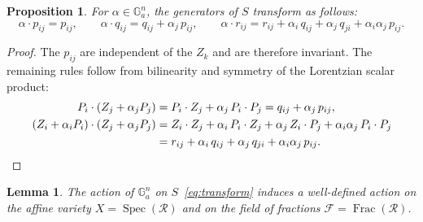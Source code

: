 \documentclass[12pt,a4paper]{extarticle}
\newtheorem{lemma}[theorem]{Lemma}
\newtheorem{proposition}[theorem]{Proposition}
\theoremstyle{definition}
\begin{document}
\begin{proposition}\label{prop:transformation-rules}
For $\alpha \in \mathbb{G}_a^n$, the generators of $S$ transform as follows:
\begin{equation}\label{eq:transform}
\alpha \cdot p_{ij} = p_{ij}, \qquad
\alpha \cdot q_{ij} = q_{ij} + \alpha_j\, p_{ij}, \qquad
\alpha \cdot r_{ij} = r_{ij} + \alpha_i\, q_{ij} + \alpha_j\, q_{ji} + \alpha_i \alpha_j\, p_{ij}.
\end{equation}
\end{proposition}

\begin{proof}
The $p_{ij}$ are independent of the $Z_k$ and are therefore invariant. The remaining rules follow from bilinearity and symmetry of the Lorentzian scalar product:
\begin{align*}
P_i \cdot (Z_j + \alpha_j P_j) &= P_i \cdot Z_j + \alpha_j\, P_i \cdot P_j = q_{ij} + \alpha_j\, p_{ij}, \\
(Z_i + \alpha_i P_i) \cdot (Z_j + \alpha_j P_j) &= Z_i \cdot Z_j + \alpha_i\, P_i \cdot Z_j + \alpha_j\, Z_i \cdot P_j + \alpha_i \alpha_j\, P_i \cdot P_j \\
&= r_{ij} + \alpha_i\, q_{ij} + \alpha_j\, q_{ji} + \alpha_i \alpha_j\, p_{ij}. \qedhere
\end{align*}
\end{proof}

\begin{lemma}\label{lem: well-defined}
The action of $\mathbb{G}_a^n$ on $S$~\eqref{eq:transform} induces a well-defined action on the affine variety $X = \operatorname{Spec}(\mathcal{R})$ and on the field of fractions $\mathcal{F} = \operatorname{Frac}(\mathcal{R})$.
\end{lemma}
\end{document}
